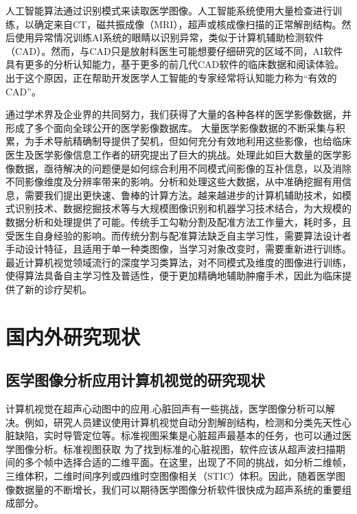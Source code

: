 人工智能算法通过识别模式来读取医学图像。人工智能系统使用大量检查进行训练，以确定来自CT，磁共振成像（MRI），超声或核成像扫描的正常解剖结构。然后使用异常情况训练AI系统的眼睛以识别异常，类似于计算机辅助检测软件（CAD）。然而，与CAD只是放射科医生可能想要仔细研究的区域不同，AI软件具有更多的分析认知能力，基于更多的前几代CAD软件的临床数据和阅读体验。出于这个原因，正在帮助开发医学人工智能的专家经常将认知能力称为“有效的CAD”。

通过学术界及企业界的共同努力，我们获得了大量的各种各样的医学影像数据，并形成了多个面向全球公开的医学影像数据库。 大量医学影像数据的不断采集与积累，为手术导航精确制导提供了契机，但如何充分有效地利用这些影像，也给临床医生及医学影像信息工作者的研究提出了巨大的挑战。处理此如巨大数量的医学影像数据，亟待解决的问题便是如何综合利用不同模式间影像的互补信息，以及消除不同影像维度及分辨率带来的影响。分析和处理这些大数据，从中准确挖掘有用信息，需要我们提出更快速、鲁棒的计算方法。越来越进步的计算机辅助技术，如模式识别技术、数据挖掘技术等与大规模图像识别和机器学习技术结合，为大规模的数据分析和处理提供了可能。传统手工勾勒分割及配准方法工作量大，耗时多，且受医生自身经验的影响。而传统分割与配准算法缺乏自主学习性，需要算法设计者手动设计特征，且适用于单一种类图像，当学习对象改变时，需要重新进行训练。最近计算机视觉领域流行的深度学习类算法，对不同模式及维度的图像进行训练，使得算法具备自主学习性及普适性，便于更加精确地辅助肿瘤手术，因此为临床提供了新的诊疗契机。       

\section{国内外研究现状}

\subsection{医学图像分析应用计算机视觉的研究现状}

计算机视觉在超声心动图中的应用.心脏回声有一些挑战，医学图像分析可以解决。例如，研究人员建议使用计算机视觉自动分割解剖结构，检测和分类先天性心脏缺陷，实时导管定位等。标准视图采集是心脏超声最基本的任务，也可以通过医学图像分析。标准视图获取 为了找到标准的心脏视图，软件应该从超声波扫描期间的多个帧中选择合适的二维平面。在这里，出现了不同的挑战，如分析二维帧，三维体积，二维时间序列或四维时空图像相关（STIC）体积。因此，随着医学图像数据量的不断增长，我们可以期待医学图像分析软件很快成为超声系统的重要组成部分。
 
